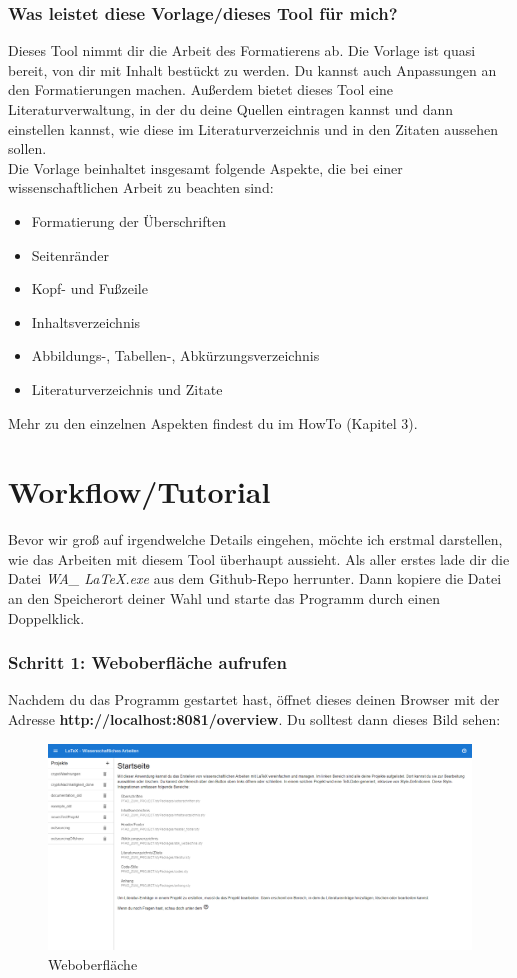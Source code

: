 \documentclass[12pt]{article}
\begin{document}
	\section{Was leistet diese Vorlage/dieses Tool für mich?}
	Dieses Tool nimmt dir die Arbeit des Formatierens ab. Die Vorlage ist quasi bereit, von dir mit Inhalt bestückt zu werden. Du kannst auch Anpassungen an den Formatierungen machen. Außerdem bietet dieses Tool eine Literaturverwaltung, in der du deine Quellen eintragen kannst und dann einstellen kannst, wie diese im Literaturverzeichnis und in den Zitaten aussehen sollen.\\
	Die Vorlage beinhaltet insgesamt folgende Aspekte, die bei einer wissenschaftlichen Arbeit zu beachten sind:
	\begin{itemize}
	\item Formatierung der Überschriften
	\item Seitenränder
	\item Kopf- und Fußzeile
	\item Inhaltsverzeichnis
	\item Abbildungs-, Tabellen-, Abkürzungsverzeichnis
	\item Literaturverzeichnis und Zitate
	\end{itemize}
	Mehr zu den einzelnen Aspekten findest du im HowTo (Kapitel 3).
	
\part{Workflow/Tutorial}
Bevor wir groß auf irgendwelche Details eingehen, möchte ich erstmal darstellen, wie das Arbeiten mit diesem Tool überhaupt aussieht. Als aller erstes lade dir die Datei \textit{WA\_ LaTeX.exe} aus dem Github-Repo herrunter. Dann kopiere die Datei an den Speicherort deiner Wahl und starte das Programm durch einen Doppelklick.
\section{Schritt 1: Weboberfläche aufrufen}
Nachdem du das Programm gestartet hast, öffnet dieses deinen Browser mit der Adresse \textbf{http://localhost:8081/overview}. Du solltest dann dieses Bild sehen:
\FloatBarrier
\begin{figure}[!ht]
\includegraphics[width=.9\textwidth]{images/screenshot_1.png}
\caption{Weboberfläche}
\end{figure}
\FloatBarrier
\end{document}

